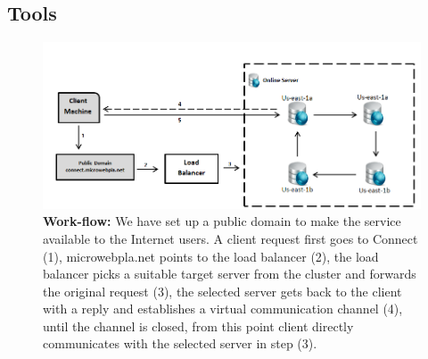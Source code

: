 \documentclass[12pt]{article}
\begin{document}
\subsection{Tools}
\begin{figure}[H]
\centering
\includegraphics[scale=0.90]{Images/figure1.PNG}
\caption{\textbf{Work-flow: }We have set up a public domain to make the service
available to the Internet users. A client request first goes to
Connect\cite{connect} (1), microwebpla.net points to the load balancer (2), the load balancer picks a suitable target server from the cluster and forwards the original request (3), the selected server gets back to the client with a reply and establishes a virtual communication channel (4), until the channel is closed, from this point client directly communicates with the selected server in step (3).}
\label{fig:workflow}
\end{figure}
\end{document}
